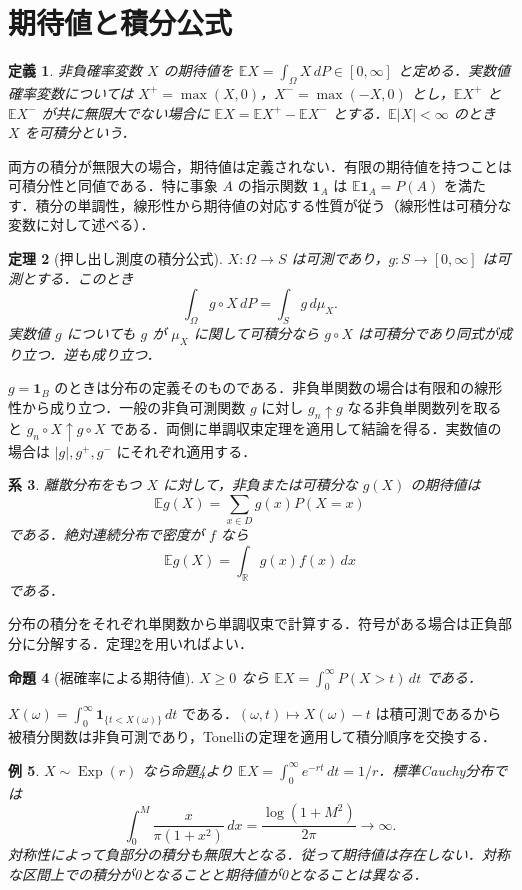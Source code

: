 \documentclass[a5paper,10pt,onecolumn]{jsarticle}
\makeatletter
\theoremstyle{mathnotetheorem}
\newtheorem{theorem}{定理}[section]
\newtheorem{definition}[theorem]{定義}
\newtheorem{proposition}[theorem]{命題}
\newtheorem{corollary}[theorem]{系}
\newtheorem{example}[theorem]{例}
\renewcommand{\proofname}{証明}
\renewenvironment{proof}[1][\proofname]{%
  \par\pushQED{\qed}\normalfont\topsep4\p@\@plus2\p@\relax
  \trivlist\item[\hskip\labelsep\bfseries #1]\ignorespaces
}{\popQED\endtrivlist\@endpefalse}
\newcommand{\R}{\mathbb{R}}
\newcommand{\E}{\mathbb E}
\newcommand{\1}{\mathbf{1}}
\makeatother
\begin{document}
\section{期待値と積分公式}
\begin{definition}
非負確率変数 $X$ の期待値を $\E X=\int_\Omega X\,dP\in[0,\infty]$ と定める．実数値確率変数については $X^+=\max(X,0)$，$X^-=\max(-X,0)$ とし，$\E X^+$ と $\E X^-$ が共に無限大でない場合に $\E X=\E X^+-\E X^-$ とする．$\E|X|<\infty$ のとき $X$ を可積分という．
\end{definition}
両方の積分が無限大の場合，期待値は定義されない．有限の期待値を持つことは可積分性と同値である．特に事象 $A$ の指示関数 $\1_A$ は $\E\1_A=P(A)$ を満たす．積分の単調性，線形性から期待値の対応する性質が従う（線形性は可積分な変数に対して述べる）．
\begin{theorem}[押し出し測度の積分公式]\label{lotus}
$X:\Omega\to S$ は可測であり，$g:S\to[0,\infty]$ は可測とする．このとき
\[
 \int_\Omega g\circ X\,dP=\int_S g\,d\mu_X.
\]
実数値 $g$ についても $g$ が $\mu_X$ に関して可積分なら $g\circ X$ は可積分であり同式が成り立つ．逆も成り立つ．
\end{theorem}
\begin{proof}
$g=\1_B$ のときは分布の定義そのものである．非負単関数の場合は有限和の線形性から成り立つ．一般の非負可測関数 $g$ に対し $g_n\uparrow g$ なる非負単関数列を取ると $g_n\circ X\uparrow g\circ X$ である．両側に単調収束定理を適用して結論を得る．実数値の場合は $|g|,g^+,g^-$ にそれぞれ適用する．
\end{proof}
\begin{corollary}
離散分布をもつ $X$ に対して，非負または可積分な $g(X)$ の期待値は
\[
 \E g(X)=\sum_{x\in D}g(x)P(X=x)
\]
である．絶対連続分布で密度が $f$ なら
\[
 \E g(X)=\int_\R g(x)f(x)\,dx
\]
である．
\end{corollary}
\begin{proof}
分布の積分をそれぞれ単関数から単調収束で計算する．符号がある場合は正負部分に分解する．定理\ref{lotus}を用いればよい．
\end{proof}
\begin{proposition}[裾確率による期待値]\label{tail}
$X\ge0$ なら $\E X=\int_0^\infty P(X>t)\,dt$ である．
\end{proposition}
\begin{proof}
$X(\omega)=\int_0^\infty\1_{\{t<X(\omega)\}}\,dt$ である．$(\omega,t)\mapsto X(\omega)-t$ は積可測であるから被積分関数は非負可測であり，Tonelliの定理を適用して積分順序を交換する．
\end{proof}
\begin{example}
$X\sim\operatorname{Exp}(r)$ なら命題\ref{tail}より $\E X=\int_0^\infty e^{-rt}\,dt=1/r$．標準Cauchy分布では
\[
 \int_0^M\frac{x}{\pi(1+x^2)}\,dx
 =\frac{\log(1+M^2)}{2\pi}\longrightarrow\infty.
\]
対称性によって負部分の積分も無限大となる．従って期待値は存在しない．対称な区間上での積分が0となることと期待値が0となることは異なる．
\end{example}
\end{document}

